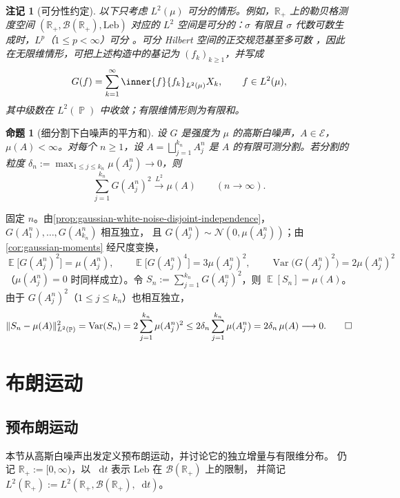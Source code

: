 \documentclass[UTF8,11pt,a4paper,oneside,fontset=fandol]{ctexrep}
\makeatletter
\numberwithin{equation}{section}
\theoremstyle{zhthm}
\newtheorem{proposition}[theorem]{命题}
\newtheorem{remark}[theorem]{注记}
\renewenvironment{proof}[1][\proofname]{\par
  \pushQED{\qed}%
  \normalfont\topsep6\p@\@plus6\p@\relax
  \trivlist
  \item[\hskip\labelsep\bfseries#1\hspace{0.5em}]\ignorespaces
}{%
  \popQED\endtrivlist\@endpefalse
}
\renewcommand{\proofname}{证明}
\newcommand{\R}{\mathbb{R}}
\newcommand{\B}{\mathcal{B}}
\DeclareMathOperator{\Prob}{\mathbb{P}}
\DeclareMathOperator{\E}{\mathbb{E}}
\DeclareMathOperator{\Var}{Var}
\newcommand{\Leb}{\mathrm{Leb}}
\newcommand{\Normal}{\mathcal{N}}
\newcommand{\dd}{\mathop{}\!\mathrm{d}}
\DeclarePairedDelimiter{\norm}{\lVert}{\rVert}
\newcommand{\Lpto}[1]{\xrightarrow{L^{#1}}}
\makeatother
\begin{document}
\begin{remark}[可分性约定]
\label{rem:white-noise-separable-convention}
以下只考虑 $L^2(\mu)$ 可分的情形。例如，$\R_+$ 上的勒贝格测度空间 $(\R_+,\B(\R_+),\Leb)$
对应的 $L^2$ 空间是可分的：$\sigma$ 有限且 $\sigma$ 代数可数生成时，$L^p$（$1\le p<\infty$）可分%
\cite[练习 1.3.9，第 37 页]{Tao2010}。可分 Hilbert 空间的正交规范基至多可数%
\cite[练习 1.4.23，第 56 页]{Tao2010}，因此在无限维情形，可把上述构造中的基记为 $(f_k)_{k\ge1}$，并写成
\[
  G(f)=\sum_{k=1}^{\infty}\inner{f}{f_k}_{L^2(\mu)}X_k,\qquad f\in L^2(\mu),
\]
其中级数在 $L^2(\Prob)$ 中收敛；有限维情形则为有限和。
\end{remark}

\begin{proposition}[细分割下白噪声的平方和]
\label{prop:gaussian-white-noise-quadratic-sums}
设 $G$ 是强度为 $\mu$ 的高斯白噪声，$A\in\mathcal{E}$，$\mu(A)<\infty$。对每个 $n\ge1$，设
$A=\bigsqcup_{j=1}^{k_n}A_j^n$ 是 $A$ 的有限可测分割。若分割的粒度
$\delta_n:=\max_{1\le j\le k_n}\mu(A_j^n)\to0$，则
\[
  \sum_{j=1}^{k_n}G(A_j^n)^2\Lpto{2}\mu(A)\qquad(n\to\infty).
\]
\end{proposition}

\begin{proof}
固定 $n$。由\cref{prop:gaussian-white-noise-disjoint-independence}，$G(A_1^n),\ldots,G(A_{k_n}^n)$ 相互独立，
且 $G(A_j^n)\sim\Normal(0,\mu(A_j^n))$；由\cref{cor:gaussian-moments} 经尺度变换，
\[
  \E\bigl[G(A_j^n)^2\bigr]=\mu(A_j^n),\qquad
  \E\bigl[G(A_j^n)^4\bigr]=3\mu(A_j^n)^2,\qquad
  \Var\bigl(G(A_j^n)^2\bigr)=2\mu(A_j^n)^2
\]
（$\mu(A_j^n)=0$ 时同样成立）。令 $S_n:=\sum_{j=1}^{k_n}G(A_j^n)^2$，则 $\E[S_n]=\mu(A)$。
由于 $G(A_j^n)^2$（$1\le j\le k_n$）也相互独立，
\[
  \norm{S_n-\mu(A)}_{L^2(\Prob)}^2=\Var(S_n)=2\sum_{j=1}^{k_n}\mu(A_j^n)^2
  \le2\delta_n\sum_{j=1}^{k_n}\mu(A_j^n)=2\delta_n\,\mu(A)\longrightarrow0.\qedhere
\]
\end{proof}

\chapter{布朗运动}
\label{chap:brownian-motion}
\section{预布朗运动}
\label{sec:pre-brownian-motion}

本节从高斯白噪声出发定义预布朗运动，并讨论它的独立增量与有限维分布。
仍记 $\R_+:=[0,\infty)$，以 $\dd t$ 表示 $\Leb$ 在 $\B(\R_+)$ 上的限制，
并简记 $L^2(\R_+):=L^2(\R_+,\B(\R_+),\dd t)$。
\end{document}
